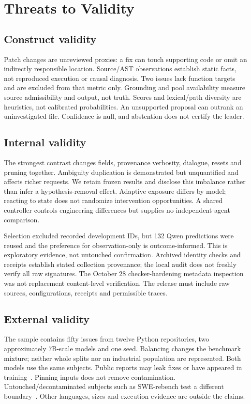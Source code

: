 \section{Threats to Validity}\label{sec:threats}
\subsection{Construct validity}
Patch changes are unreviewed proxies: a fix can touch supporting code or omit an indirectly responsible location. Source/AST observations establish static facts, not reproduced execution or causal diagnosis. Two issues lack function targets and are excluded from that metric only. Grounding and pool availability measure source admissibility and output, not truth. Scores and lexical/path diversity are heuristics, not calibrated probabilities. An unsupported proposal can outrank an uninvestigated file. Confidence is null, and abstention does not certify the leader.

\subsection{Internal validity}
The strongest contrast changes fields, provenance verbosity, dialogue, resets and pruning together. Ambiguity duplication is demonstrated but unquantified and affects richer requests. We retain frozen results and disclose this imbalance rather than infer a hypothesis-removal effect. Adaptive exposure differs by model; reacting to state does not randomize intervention opportunities. A shared controller controls engineering differences but supplies no independent-agent comparison.

Selection excluded recorded development IDs, but 132 Qwen predictions were reused and the preference for observation-only is outcome-informed. This is exploratory evidence, not untouched confirmation. Archived identity checks and receipts establish stated collection provenance; the local audit does not freshly verify all raw signatures. The October 28 checker-hardening metadata inspection was not replacement content-level verification. The release must include raw sources, configurations, receipts and permissible traces.

\subsection{External validity}
The sample contains fifty issues from twelve Python repositories, two approximately 7B-scale models and one seed. Balancing changes the benchmark mixture; neither whole splits nor an industrial population are represented. Both models use the same subjects. Public reports may leak fixes or have appeared in training~\citep{swebenchillusion2025,swebenchplus2024}. Pinning inputs does not remove contamination. Untouched/decontaminated subjects such as SWE-rebench test a different boundary~\citep{swerebench2025}. Other languages, sizes and execution evidence are outside the claims.

